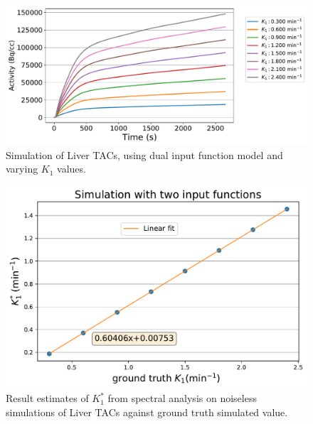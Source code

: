 %
\begin{figure}[ht!]
\centering
\includegraphics[scale=0.48,angle=0]{appendices/figures/ApendixC_multiple_K1.pdf}
\caption{Simulation of Liver TACs, using dual input function model and varying $K_1$ values.}
\label{fig_3_3:K1_Sims}
\end{figure} 
%
\begin{figure}[ht!]
\centering
\includegraphics[scale=0.48,angle=0]{appendices/figures/ApendixC_multiple_K1_solution.pdf}
\caption{Result estimates of $K_1^{*}$ from spectral analysis on noiseless simulations of Liver TACs against ground truth simulated value.}
\label{fig_3_3:K1_Sims_Results}
\end{figure} 